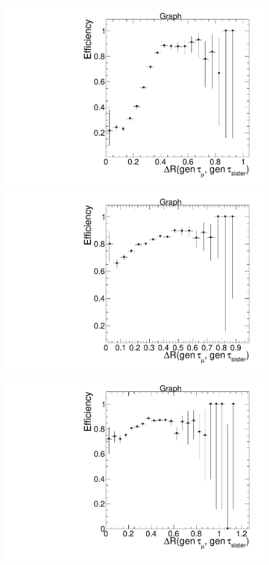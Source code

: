 \begin{figure}[hbtp]
  \begin{center}
    \includegraphics[width=0.8\cmsFigWidth]{figures/dREfficiency_WmuIDIso_muEOnly}
    \includegraphics[width=0.8\cmsFigWidth]{figures/dREfficiency_WmuIDIso_muMuOnly}
    \includegraphics[width=0.8\cmsFigWidth]{figures/dREfficiency_WmuIDIso_muHadOnly}

\end{center}
\end{figure}

